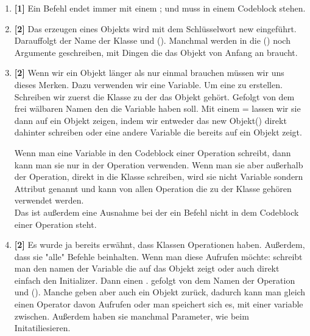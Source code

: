 \begin{enumerate}
    \begin{Infobox}{Namen}
        Freiwählbare namen, müssen trotzdem ein paar Regeln Folgen
        \begin{itemize}
            \item Sie dürfen nicht gleich wie ein Schlüsselwort(z.B. class oder new) heißen.
            \item Sie dürfen nicht mit einer Ziffer beginnen.
            \item Sie dürfen kein Leerzeichen beinhalten.
        \end{itemize}
    \end{Infobox}
    \item \textbf{[1]} Ein Befehl endet immer mit einem ; und muss in einem Codeblock stehen.
    \item \textbf{[2]} Das erzeugen eines Objekts wird mit dem Schlüsselwort new eingeführt. Darauffolgt der Name der Klasse und (). Manchmal werden in die () noch Argumente geschreiben, mit Dingen die das Objekt von Anfang an braucht.
    \item \textbf{[2]} Wenn wir ein Objekt länger als nur einmal brauchen müssen wir uns dieses Merken. Dazu verwenden wir eine Variable. Um eine zu erstellen. Schreiben wir zuerst die Klasse zu der das Objekt gehört. Gefolgt von dem frei wälbaren Namen den die Variable haben soll. Mit einem = lassen wir sie dann auf ein Objekt zeigen, indem wir entweder das new Objekt() direkt dahinter schreiben oder eine andere 
    Variable die bereits auf ein Objekt zeigt.
    \begin{Infobox}[Attribute]
        Wenn man eine Variable in den Codeblock einer Operation schreibt, dann kann man sie nur in der Operation verwenden.
        Wenn man sie aber außerhalb der Operation, direkt in die Klasse schreiben, wird sie nicht Variable sondern Attribut genannt und kann von allen Operation die zu der Klasse gehören verwendet werden.\\
        Das ist außerdem eine Ausnahme bei der ein Befehl nicht in dem Codeblock einer Operation steht.
    \end{Infobox}
    \item \textbf{[2]} Es wurde ja bereits erwähnt, dass Klassen Operationen haben. Außerdem, dass sie "alle" Befehle beinhalten. Wenn man diese Aufrufen möchte: schreibt man den namen der Variable die auf das Objekt zeigt oder auch direkt einfach den Initializer. Dann einen . gefolgt von dem Namen der Operation und (). Manche geben aber auch ein Objekt zurück, dadurch kann man gleich einen Operator davon Aufrufen oder man speichert sich es, mit einer variable zwischen. Außerdem haben sie manchmal Parameter, wie beim Initatiliesieren.

\end{enumerate}
